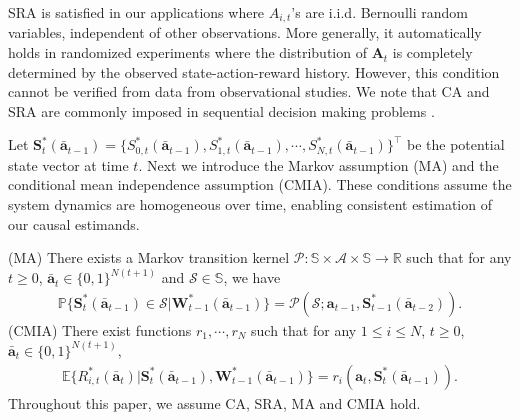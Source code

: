 \documentclass{article}
\newcommand{\Mean}{{\mathbb{E}}}
\newcommand{\prob}{{\mathbb{P}}}
\begin{document}
\vspace*{-0.2cm}
SRA is satisfied in our applications where $A_{i,t}$'s are i.i.d. Bernoulli random variables, independent of other observations. More generally, it automatically holds in randomized experiments where the distribution of $\bm{A}_t$ is completely determined by the observed state-action-reward history. However, this condition cannot be verified from data from observational studies. We note that CA and SRA are commonly imposed in sequential decision making problems \citep[see e.g.,][]{Murphy2003,robins2004,Zhang2013,ertefaie2014,Laber2018,luckett2019}. 

Let $\bm{S}_t^*(\bar{\bm{a}}_{t-1})=\{S_{0,t}^*(\bar{\bm{a}}_{t-1}), S_{1,t}^*(\bar{\bm{a}}_{t-1}),\cdots,S_{N,t}^*(\bar{\bm{a}}_{t-1})\}^\top$ be the potential state vector at time $t$. Next we introduce the Markov assumption (MA) and the conditional mean independence assumption (CMIA). These conditions assume the system dynamics are homogeneous over time, enabling consistent estimation of our causal estimands. 

(MA) There exists a Markov transition kernel $\mathcal{P}: \mathbb{S}\times \mathcal{A} \times \mathbb{S}\to \mathbb{R}$ such that for any $t \ge 0$, $\bar{\bm{a}}_t\in \{0,1\}^{N(t+1)}$ and $\mathcal{S}\in \mathbb{S}$, we have
\vspace*{-0.1cm}
\begin{eqnarray*}
	\prob \{\bm{S}_t^*(\bar{\bm{a}}_{t-1})\in \mathcal{S}|\bm{W}_{t-1}^*(\bar{\bm{a}}_{t-1})\}=\mathcal{P}(\mathcal{S};\bm{a}_{t-1},\bm{S}_{t-1}^*(\bar{\bm{a}}_{t-2})).
\end{eqnarray*}
\vspace*{-0.1cm}
(CMIA) There exist functions $r_1,\cdots,r_N$ such that for any $1\le i\le N$, $t\ge 0$, $\bar{\bm{a}}_t\in \{0,1\}^{N(t+1)}$,%
\begin{eqnarray*}
	\Mean \{R_{i,t}^*(\bar{\bm{a}}_{t})| \bm{S}_t^*(\bar{\bm{a}}_{t-1}),\bm{W}_{t-1}^*(\bar{\bm{a}}_{t-1})\}=r_i(\bm{a}_t,\bm{S}_t^*(\bar{\bm{a}}_{t-1})).
\end{eqnarray*}
Throughout this paper, we assume CA, SRA, MA and CMIA hold. 
\end{document}
